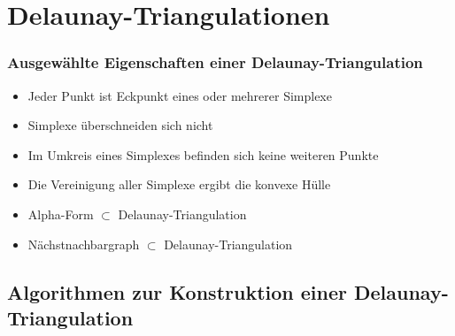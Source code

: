 \section{Delaunay-Triangulationen}
\label{appendix_delaunay}

\subsubsection{Ausgewählte Eigenschaften einer Delaunay-Triangulation}

\begin{itemize}
\item Jeder Punkt ist Eckpunkt eines oder mehrerer Simplexe
\item Simplexe überschneiden sich nicht
\item Im Umkreis eines Simplexes befinden sich keine weiteren Punkte
\item Die Vereinigung aller Simplexe ergibt die konvexe Hülle
\item Alpha-Form $\subset$ Delaunay-Triangulation
\item %
  Nächstnachbargraph $\subset$ Delaunay-Triangulation
\end{itemize}

\subsection{Algorithmen zur Konstruktion einer Delaunay-Triangulation}

